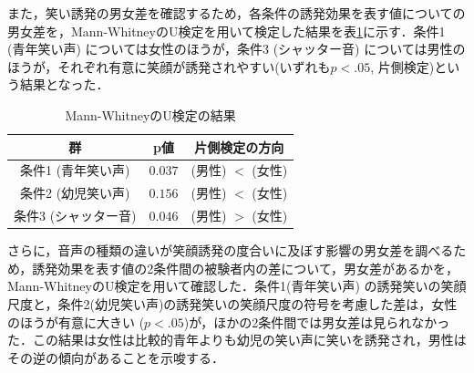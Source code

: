 \documentclass[submit,techreq]{ec2014}
\begin{document}
また，笑い誘発の男女差を確認するため，各条件の誘発効果を表す値についての男女差を，Mann-WhitneyのU検定を用いて検定した結果を表\ref{manw}に示す．条件1 (青年笑い声) については女性のほうが，条件3 (シャッター音) については男性のほうが，それぞれ有意に笑顔が誘発されやすい(いずれも$p<.05$, 片側検定)という結果となった．

\begin{table}[htb]
  \begin{center}
    \caption{Mann-WhitneyのU検定の結果}
    \begin{tabular}{|c|c|c|}  \hline
      群 & p値 & 片側検定の方向 \\ \hline \hline
      条件1 (青年笑い声) & $0.037$ & (男性) $<$ (女性) \\ \hline
      条件2 (幼児笑い声)  & $0.156$ & (男性) $<$ (女性) \\ \hline
      条件3 (シャッター音) & $0.046$ & (男性) $>$ (女性) \\ \hline
    \end{tabular}
    \label{manw}
  \end{center}
\end{table}


さらに，音声の種類の違いが笑顔誘発の度合いに及ぼす影響の男女差を調べるため，誘発効果を表す値の2条件間の被験者内の差について，男女差があるかを，Mann-WhitneyのU検定を用いて確認した．条件1(青年笑い声) の誘発笑いの笑顔尺度と，条件2(幼児笑い声)の誘発笑いの笑顔尺度の符号を考慮した差は，女性のほうが有意に大きい ($p<.05$)が，ほかの2条件間では男女差は見られなかった．この結果は女性は比較的青年よりも幼児の笑い声に笑いを誘発され，男性はその逆の傾向があることを示唆する．


\end{document}
